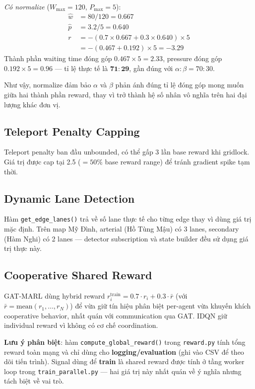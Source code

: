 \documentclass[conference]{IEEEtran}
\begin{document}
\textit{Có normalize} ($W_{\max}=120$, $P_{\max}=5$):
\begin{align*}
    \hat{w} &= 80 / 120 = 0.667 \\
    \hat{p} &= 3.2 / 5 = 0.640 \\
    r &= -(0.7 \times 0.667 + 0.3 \times 0.640) \times 5 \\
      &= -(0.467 + 0.192) \times 5 = -3.29
\end{align*}
Thành phần waiting time đóng góp $0.467 \times 5 = 2.33$, pressure đóng góp $0.192 \times 5 = 0.96$ --- tỉ lệ thực tế là $\mathbf{71{:}29}$, gần đúng với $\alpha{:}\beta = 70{:}30$.

Như vậy, normalize đảm bảo $\alpha$ và $\beta$ phản ánh đúng tỉ lệ đóng góp mong muốn giữa hai thành phần reward, thay vì trở thành hệ số nhân vô nghĩa trên hai đại lượng khác đơn vị.

\subsection{Teleport Penalty Capping}

Teleport penalty ban đầu unbounded, có thể gấp 3 lần base reward khi gridlock. Giá trị được cap tại 2.5 ($= 50\%$ base reward range) để tránh gradient spike tạm thời.

\subsection{Dynamic Lane Detection}

Hàm \texttt{get\_edge\_lanes()} trả về số lane thực tế cho từng edge thay vì dùng giá trị mặc định. Trên map Mỹ Đình, arterial (Hồ Tùng Mậu) có 3 lanes, secondary (Hàm Nghi) có 2 lanes --- detector subscription và state builder đều sử dụng giá trị thực này.

\subsection{Cooperative Shared Reward}

GAT-MARL dùng hybrid reward $r_i^{\text{train}} = 0.7 \cdot r_i + 0.3 \cdot \bar{r}$ (với $\bar{r} = \text{mean}(r_1, \ldots, r_N)$) để vừa giữ tín hiệu phân biệt per-agent vừa khuyến khích cooperative behavior, nhất quán với communication qua GAT. IDQN giữ individual reward vì không có cơ chế coordination.

\textbf{Lưu ý phân biệt}: hàm \texttt{compute\_global\_reward()} trong \texttt{reward.py} tính tổng reward toàn mạng và chỉ dùng cho \textbf{logging/evaluation} (ghi vào CSV để theo dõi tiến trình). Signal dùng để \textbf{train} là shared reward được tính ở tầng worker loop trong \texttt{train\_parallel.py} --- hai giá trị này nhất quán về ý nghĩa nhưng tách biệt về vai trò.
\end{document}
